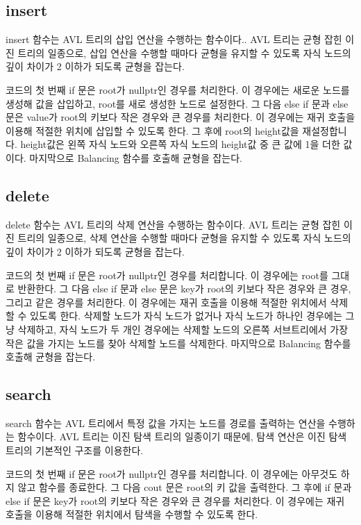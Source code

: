 \documentclass{article}
\begin{document}
\subsection{insert}
insert 함수는 AVL 트리의 삽입 연산을 수행하는 함수이다..
AVL 트리는 균형 잡힌 이진 트리의 일종으로, 삽입 연산을 수행할 때마다 균형을 유지할 수 있도록 자식 노드의 깊이 차이가 2 이하가 되도록 균형을 잡는다.

코드의 첫 번째 if 문은 root가 nullptr인 경우를 처리한다. 이 경우에는 새로운 노드를 생성해 값을 삽입하고, root를 새로 생성한 노드로 설정한다.
그 다음 else if 문과 else 문은 value가 root의 키보다 작은 경우와 큰 경우를 처리한다. 이 경우에는 재귀 호출을 이용해 적절한 위치에 삽입할 수 있도록 한다.
그 후에 root의 height값을 재설정합니다. height값은 왼쪽 자식 노드와 오른쪽 자식 노드의 height값 중 큰 값에 1을 더한 값이다.
마지막으로 Balancing 함수를 호출해 균형을 잡는다.

\subsection{delete}
delete 함수는 AVL 트리의 삭제 연산을 수행하는 함수이다.
AVL 트리는 균형 잡힌 이진 트리의 일종으로, 삭제 연산을 수행할 때마다 균형을 유지할 수 있도록 자식 노드의 깊이 차이가 2 이하가 되도록 균형을 잡는다.

코드의 첫 번째 if 문은 root가 nullptr인 경우를 처리합니다. 이 경우에는 root를 그대로 반환한다.
그 다음 else if 문과 else 문은 key가 root의 키보다 작은 경우와 큰 경우, 그리고 같은 경우를 처리한다. 이 경우에는 재귀 호출을 이용해 적절한 위치에서 삭제할 수 있도록 한다.
삭제할 노드가 자식 노드가 없거나 자식 노드가 하나인 경우에는 그냥 삭제하고, 자식 노드가 두 개인 경우에는 삭제할 노드의 오른쪽 서브트리에서 가장 작은 값을 가지는 노드를 찾아 삭제할 노드를 삭제한다. 마지막으로 Balancing 함수를 호출해 균형을 잡는다.

\subsection{search}
search 함수는 AVL 트리에서 특정 값을 가지는 노드를 경로를 출력하는 연산을 수행하는 함수이다.
AVL 트리는 이진 탐색 트리의 일종이기 때문에, 탐색 연산은 이진 탐색 트리의 기본적인 구조를 이용한다.

코드의 첫 번째 if 문은 root가 nullptr인 경우를 처리합니다. 이 경우에는 아무것도 하지 않고 함수를 종료한다.
그 다음 cout 문은 root의 키 값을 출력한다.
그 후에 if 문과 else if 문은 key가 root의 키보다 작은 경우와 큰 경우를 처리한다. 이 경우에는 재귀 호출을 이용해 적절한 위치에서 탐색을 수행할 수 있도록 한다.
\end{document}
